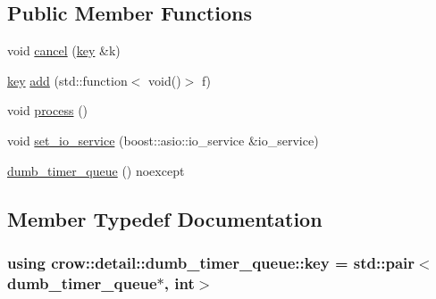 \subsection*{Public Member Functions}
\begin{DoxyCompactItemize}
\item 
void \hyperlink{classcrow_1_1detail_1_1dumb__timer__queue_ac5ad0edafcaca57130e1cfb2f4568f7b}{cancel} (\hyperlink{classcrow_1_1detail_1_1dumb__timer__queue_ab5d8614b57cf57c37d51428b3baad6d8}{key} \&k)
\item 
\hyperlink{classcrow_1_1detail_1_1dumb__timer__queue_ab5d8614b57cf57c37d51428b3baad6d8}{key} \hyperlink{classcrow_1_1detail_1_1dumb__timer__queue_a9861970e8023769fd7f87dc91f908c97}{add} (std\-::function$<$ void()$>$ f)
\item 
void \hyperlink{classcrow_1_1detail_1_1dumb__timer__queue_a5822b813fd984da37971cb21133bb67c}{process} ()
\item 
void \hyperlink{classcrow_1_1detail_1_1dumb__timer__queue_a6b6bcf618fcdfe8095399fbfe4e79d7d}{set\-\_\-io\-\_\-service} (boost\-::asio\-::io\-\_\-service \&io\-\_\-service)
\item 
\hyperlink{classcrow_1_1detail_1_1dumb__timer__queue_a9f3f50bc318d1668a4955b3211a70374}{dumb\-\_\-timer\-\_\-queue} () noexcept
\end{DoxyCompactItemize}


\subsection{Member Typedef Documentation}
\hypertarget{classcrow_1_1detail_1_1dumb__timer__queue_ab5d8614b57cf57c37d51428b3baad6d8}{
\subsubsection[{key}]{\setlength{\rightskip}{0pt plus 5cm}using {\bf crow\-::detail\-::dumb\-\_\-timer\-\_\-queue\-::key} =  std\-::pair$<${\bf dumb\-\_\-timer\-\_\-queue}$\ast$, int$>$}}\label{classcrow_1_1detail_1_1dumb__timer__queue_ab5d8614b57cf57c37d51428b3baad6d8}


